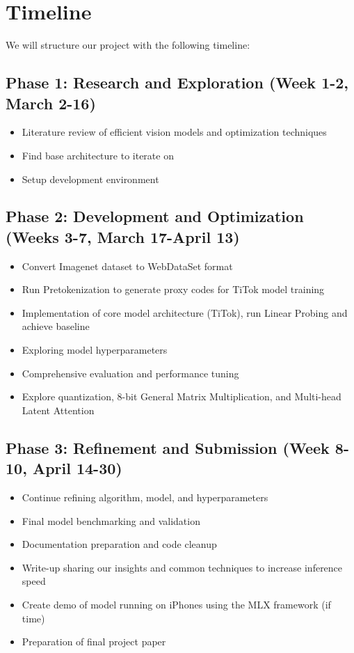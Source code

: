 \documentclass[11pt, oneside]{article}   	%
\begin{document}
\section*{Timeline}

We will structure our project with the following timeline:

\subsection*{Phase 1: Research and Exploration (Week 1-2, March 2-16)}

\begin{itemize}
	\item Literature review of efficient vision models and optimization techniques
    \item Find base architecture to iterate on
	\item Setup development environment
\end{itemize}

\subsection*{Phase 2: Development and Optimization (Weeks 3-7, March 17-April 13)}

\begin{itemize}
	\item Convert Imagenet dataset to WebDataSet format
    \item Run Pretokenization to generate proxy codes for TiTok model training
    \item Implementation of core model architecture (TiTok), run Linear Probing and achieve baseline
	\item Exploring model hyperparameters
	\item Comprehensive evaluation and performance tuning
    \item Explore quantization, 8-bit General Matrix Multiplication, and Multi-head Latent Attention
\end{itemize}

\subsection*{Phase 3: Refinement and Submission (Week 8-10, April 14-30)}

\begin{itemize}
	\item Continue refining algorithm, model, and hyperparameters
	\item Final model benchmarking and validation
	\item Documentation preparation and code cleanup
    \item Write-up sharing our insights and common techniques to increase inference speed
    \item Create demo of model running on iPhones using the MLX framework (if time) \cite{mlx2023}
	\item Preparation of final project paper
\end{itemize}
\end{document}
